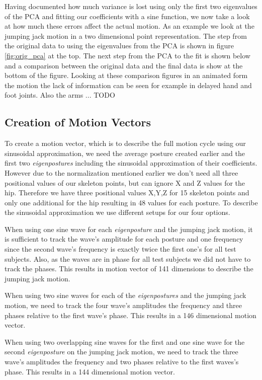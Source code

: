 \documentclass[a4paper]{article}
\begin{document}
Having documented how much variance is lost using only the first two eigenvalues of the PCA and fitting our coefficients with a sine function, we now take a look at how much these errors affect the actual motion.
As an example we look at the jumping jack motion in a two dimensional point representation.
The step from the original data to using the eigenvalues from the PCA is shown in figure \ref{fig:orig_pca} at the top.
The next step from the PCA to the fit is shown below and a comparison between the original data and the final data is show at the bottom of the figure.
Looking at these comparison figures in an animated form the motion the lack of information can be seen for example in delayed hand and foot joints. Also the arms ... TODO

\subsection{Creation of Motion Vectors}
To create a motion vector, which is to describe the full motion cycle using our sinusoidal approximation, we need the average posture created earlier and the first two \emph{eigenpostures} including the sinusoidal approximation of their coefficients.
However due to the normalization mentioned earlier we don't need all three positional values of our skeleton points, but can ignore X and Z values for the hip.
Therefore we have three positional values X,Y,Z for 15 skeleton points and only one additional for the hip resulting in 48 values for each posture.
To describe the sinusoidal approximation we use different setups for our four options.

When using one sine wave for each \emph{eigenposture} and the jumping jack motion, it is sufficient to track the wave's amplitude for each posture and one frequency since the second wave's frequency is exactly twice the first one's for all test subjects.
Also, as the waves are in phase for all test subjects we did not have to track the phases.
This results in motion vector of 141 dimensions to describe the jumping jack motion.

When using two sine waves for each of the \emph{eigenpostures} and the jumping jack motion, we need to track the four wave's amplitudes the frequency and three phases relative to the first wave's phase.
This results in a 146 dimensional motion vector.

When using two overlapping sine waves for the first and one sine wave for the second \emph{eigenposture} on the jumping jack motion, we need to track the three wave's amplitudes the frequency and two phases relative to the first waves's phase.
This results in a 144 dimensional motion vector.
\end{document}
